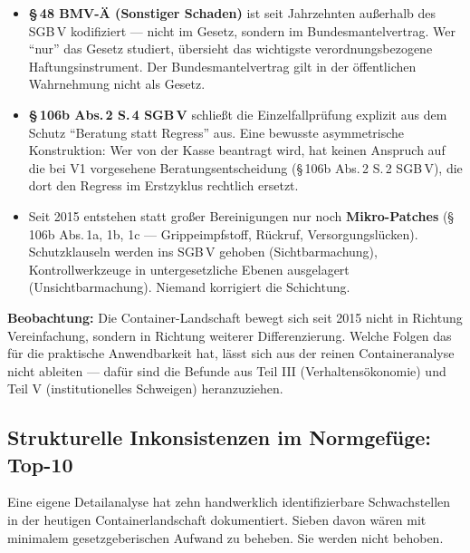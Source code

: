 \documentclass{umbruch-position}
\begin{document}
\begin{itemize}[nosep]
  \item \textbf{\S\,48 BMV-Ä (Sonstiger Schaden)} ist seit Jahrzehnten außerhalb des SGB\,V kodifiziert --- nicht im Gesetz, sondern im Bundesmantelvertrag. Wer ``nur'' das Gesetz studiert, übersieht das wichtigste verordnungsbezogene Haftungsinstrument. Der Bundesmantelvertrag gilt in der öffentlichen Wahrnehmung nicht als Gesetz.
  \item \textbf{\S\,106b Abs.\,2 S.\,4 SGB\,V} schließt die Einzelfallprüfung explizit aus dem Schutz ``Beratung statt Regress'' aus. Eine bewusste asymmetrische Konstruktion: Wer von der Kasse beantragt wird, hat keinen Anspruch auf die bei V1 vorgesehene Beratungsentscheidung (\S\,106b Abs.\,2 S.\,2 SGB\,V), die dort den Regress im Erstzyklus rechtlich ersetzt.
  \item Seit 2015 entstehen statt großer Bereinigungen nur noch \textbf{Mikro-Patches} (\S\,106b Abs.\,1a, 1b, 1c --- Grippeimpfstoff, Rückruf, Versorgungslücken). Schutzklauseln werden ins SGB\,V gehoben (Sichtbarmachung), Kontrollwerkzeuge in untergesetzliche Ebenen ausgelagert (Unsichtbarmachung). Niemand korrigiert die Schichtung.
\end{itemize}

\textbf{Beobachtung:} Die Container-Landschaft bewegt sich seit 2015 nicht in Richtung Vereinfachung, sondern in Richtung weiterer Differenzierung. Welche Folgen das für die praktische Anwendbarkeit hat, lässt sich aus der reinen Containeranalyse nicht ableiten --- dafür sind die Befunde aus Teil III (Verhaltensökonomie) und Teil V (institutionelles Schweigen) heranzuziehen.

\subsection{Strukturelle Inkonsistenzen im Normgefüge: Top-10}

Eine eigene Detailanalyse hat zehn handwerklich identifizierbare Schwachstellen in der heutigen Containerlandschaft dokumentiert. Sieben davon wären mit minimalem gesetzgeberischen Aufwand zu beheben. Sie werden nicht behoben.
\end{document}

